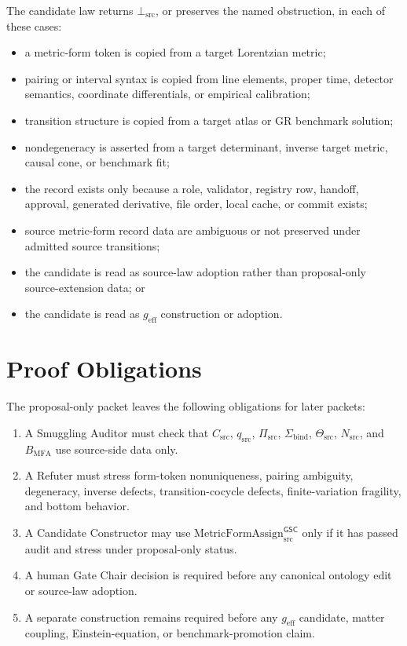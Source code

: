 \documentclass[11pt]{article}
\newcommand{\geff}{g_{\mathrm{eff}}}
\newcommand{\MetricFormAssign}{\mathrm{MetricFormAssign}_{\mathrm{src}}^{\mathsf{GSC}}}
\newcommand{\CarrierSrc}{C_{\mathrm{src}}}
\newcommand{\FormTok}{q_{\mathrm{src}}}
\newcommand{\PairTok}{\Pi_{\mathrm{src}}}
\newcommand{\TransportTok}{\Theta_{\mathrm{src}}}
\newcommand{\NondegTok}{N_{\mathrm{src}}}
\newcommand{\BottomSrc}{\bot_{\mathrm{src}}}
\begin{document}
The candidate law returns \(\BottomSrc\), or preserves the named obstruction,
in each of these cases:
\begin{itemize}[leftmargin=*]
  \item a metric-form token is copied from a target Lorentzian metric;
  \item pairing or interval syntax is copied from line elements, proper time,
  detector semantics, coordinate differentials, or empirical calibration;
  \item transition structure is copied from a target atlas or GR benchmark
  solution;
  \item nondegeneracy is asserted from a target determinant, inverse target
  metric, causal cone, or benchmark fit;
  \item the record exists only because a role, validator, registry row,
  handoff, approval, generated derivative, file order, local cache, or commit
  exists;
  \item source metric-form record data are ambiguous or not preserved under
  admitted source transitions;
  \item the candidate is read as source-law adoption rather than proposal-only
  source-extension data; or
  \item the candidate is read as \(\geff\) construction or adoption.
\end{itemize}

\section{Proof Obligations}

The proposal-only packet leaves the following obligations for later packets:
\begin{enumerate}[leftmargin=*]
  \item A Smuggling Auditor must check that \(\CarrierSrc\), \(\FormTok\),
  \(\PairTok\), \(\Sigma_{\mathrm{bind}}\), \(\TransportTok\),
  \(\NondegTok\), and \(B_{\mathrm{MFA}}\) use source-side data only.
  \item A Refuter must stress form-token nonuniqueness, pairing ambiguity,
  degeneracy, inverse defects, transition-cocycle defects, finite-variation
  fragility, and bottom behavior.
  \item A Candidate Constructor may use \(\MetricFormAssign\) only if it has
  passed audit and stress under proposal-only status.
  \item A human Gate Chair decision is required before any canonical ontology
  edit or source-law adoption.
  \item A separate construction remains required before any \(\geff\)
  candidate, matter coupling, Einstein-equation, or benchmark-promotion claim.
\end{enumerate}
\end{document}

